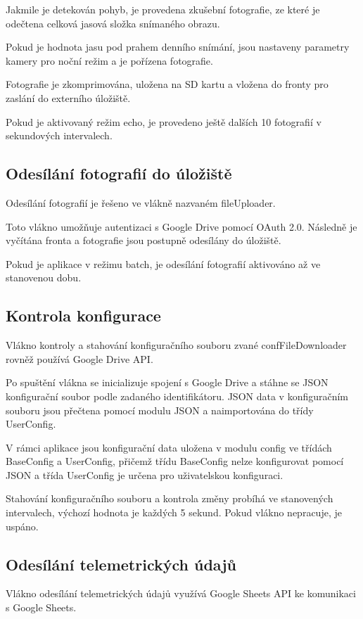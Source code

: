 Jakmile je detekován pohyb, je provedena zkušební fotografie, ze které je odečtena celková jasová složka snímaného obrazu.

Pokud je hodnota jasu pod prahem denního snímání, jsou nastaveny parametry kamery pro noční režim a je pořízena fotografie.

 Fotografie je zkomprimována, uložena na SD kartu a vložena do fronty pro zaslání do externího úložiště.
 
 Pokud je aktivovaný režim echo, je provedeno ještě dalších 10 fotografií v sekundových intervalech.

\subsection*{Odesílání fotografií do úložiště}
Odesílání fotografií je řešeno ve vlákně nazvaném fileUploader.

Toto vlákno umožňuje autentizaci s Google Drive pomocí OAuth 2.0. Následně je vyčítána fronta a fotografie jsou postupně odesílány do úložiště.

Pokud je aplikace v režimu batch, je odesílání fotografií aktivováno až ve stanovenou dobu.

\subsection*{Kontrola konfigurace}
Vlákno kontroly a stahování konfiguračního souboru zvané confFileDownloader rovněž používá Google Drive API.

Po spuštění vlákna se inicializuje spojení s Google Drive a stáhne se JSON konfigurační soubor podle zadaného identifikátoru. JSON data v konfiguračním souboru jsou přečtena pomocí modulu JSON a naimportována do třídy UserConfig.

V rámci aplikace jsou konfigurační data uložena v modulu config ve třídách BaseConfig a UserConfig, přičemž třídu BaseConfig nelze konfigurovat pomocí JSON a třída UserConfig je určena pro uživatelskou konfiguraci.

Stahování konfiguračního souboru a kontrola změny probíhá ve stanovených intervalech, výchozí hodnota je každých 5 sekund. Pokud vlákno nepracuje, je uspáno.

\subsection*{Odesílání telemetrických údajů}
Vlákno odesílání telemetrických údajů využívá Google Sheets API ke komunikaci s Google Sheets.

